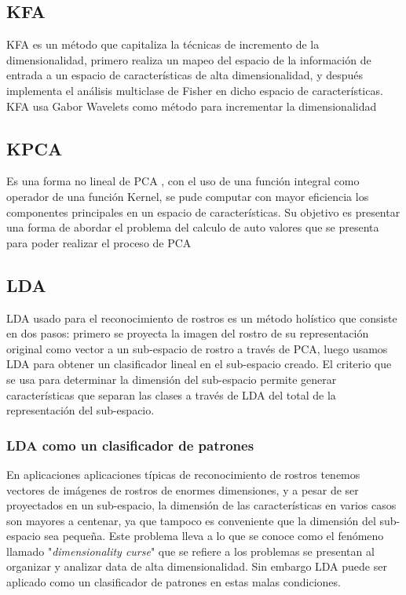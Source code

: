 \subsection{\ac{KFA}}
\ac{KFA} \cite{liu2006capitalize} es un método que capitaliza la técnicas de incremento de la dimensionalidad, primero realiza un mapeo del espacio de la información de entrada a un espacio de características de alta dimensionalidad, y después implementa el análisis multiclase de Fisher en dicho espacio de características. \ac{KFA} usa Gabor Wavelets como método para incrementar la dimensionalidad
\subsection{\ac{KPCA}}
Es una forma no lineal de \ac{PCA} \cite{scholkopf1998nonlinear}, con el uso de una función integral como operador de una función Kernel, se pude computar con mayor eficiencia los componentes principales en un espacio de características. Su objetivo es presentar una forma de abordar el problema del calculo de auto valores que se presenta para poder realizar el proceso de \ac{PCA}
\subsection{\ac{LDA}}
\ac{LDA} usado para el reconocimiento de rostros \cite{zhao1999subspace} es un método holístico que consiste en dos pasos: primero se proyecta la imagen del rostro de su representación original como vector a un sub-espacio de rostro a través de \ac{PCA}, luego usamos LDA para obtener un clasificador lineal en el sub-espacio creado. El criterio que se usa para determinar la dimensión del sub-espacio permite generar características que separan las clases a través de \ac{LDA} del total de la representación del sub-espacio.
\subsubsection{\ac{LDA} como un clasificador de patrones}
En aplicaciones aplicaciones típicas de reconocimiento de rostros tenemos vectores de imágenes de rostros de enormes dimensiones, y a pesar de ser proyectados en un sub-espacio, la dimensión de las características en varios casos son mayores a centenar, ya que tampoco es conveniente que la dimensión del sub-espacio sea pequeña. Este problema lleva a lo que se conoce como el fenómeno llamado "\textit{dimensionality curse}" que se refiere a los problemas se presentan al organizar y analizar data de alta dimensionalidad.
Sin embargo \ac{LDA} puede ser aplicado como un clasificador de patrones en estas malas condiciones.
